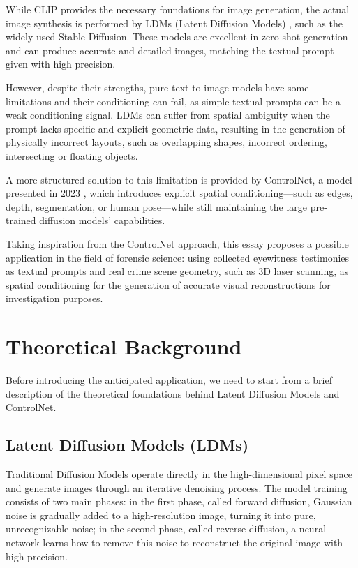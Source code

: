\documentclass[10pt,twocolumn,letterpaper]{article}
\begin{document}
While CLIP provides the necessary foundations for image generation, the actual image synthesis is performed by LDMs (Latent Diffusion Models) \cite{Rombach_2022_CVPR}, such as the widely used Stable Diffusion. These models are excellent in zero-shot generation and can produce accurate and detailed images, matching the textual prompt given with high precision.

However, despite their strengths, pure text-to-image models have some limitations and their conditioning can fail, as simple textual prompts can be a weak conditioning signal. LDMs can suffer from spatial ambiguity when the prompt lacks specific and explicit geometric data, resulting in the generation of physically incorrect layouts, such as overlapping shapes, incorrect ordering, intersecting or floating objects.

A more structured solution to this limitation is provided by ControlNet, a model presented in 2023 \cite{Zhang_2023_ICCV}, which introduces explicit spatial conditioning—such as edges, depth, segmentation, or human pose—while still maintaining the large pre-trained diffusion models' capabilities.

Taking inspiration from the ControlNet approach, this essay proposes a possible application in the field of forensic science: using collected eyewitness testimonies as textual prompts and real crime scene geometry, such as 3D laser scanning, as spatial conditioning for the generation of accurate visual reconstructions for investigation purposes.


\section{Theoretical Background}

Before introducing the anticipated application, we need to start from a brief description of the theoretical foundations behind Latent Diffusion Models and ControlNet.

\subsection{Latent Diffusion Models (LDMs)}

Traditional Diffusion Models \cite{NEURIPS2020_4c5bcfec} operate directly in the high-dimensional pixel space and generate images through an iterative denoising process. The model training consists of two main phases: in the first phase, called forward diffusion, Gaussian noise is gradually added to a high-resolution image, turning it into pure, unrecognizable noise; in the second phase, called reverse diffusion, a neural network learns how to remove this noise to reconstruct the original image with high precision.
\end{document}
